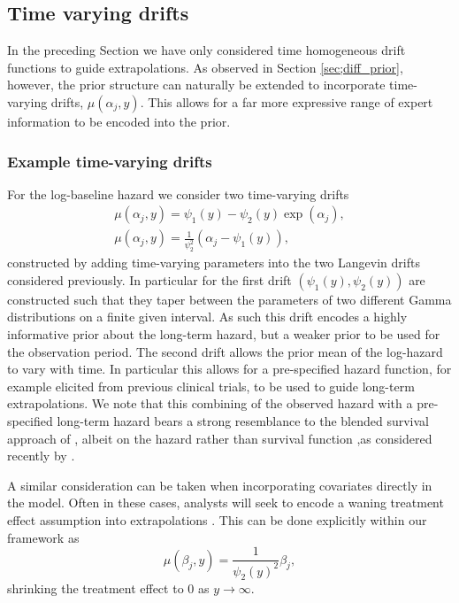 \documentclass[ba,preprint]{imsart}
\theoremstyle{plain}
\theoremstyle{definition}
\theoremstyle{remark}
\begin{document}
\subsection{Time varying drifts}
\label{sec;TimeVarying}
In the preceding Section we have only considered time homogeneous drift functions to guide extrapolations. As observed in Section \ref{sec;diff_prior}, however, the prior structure can naturally be extended to incorporate time-varying drifts, $\mu(\alpha_j,y)$. This allows for a far more expressive range of expert information to be encoded into the prior.

\subsubsection{Example time-varying drifts}

For the log-baseline hazard we consider two time-varying drifts
\begin{gather}
    \label{eq;Converge}
    \mu(\alpha_j, y) = \psi_1(y) - \psi_2(y)\exp(\alpha_j), \\ 
    \label{eq;Centred}
    \mu(\alpha_j, y) = \frac{1}{\psi_2^2}(\alpha_j - \psi_1(y)),
\end{gather}
constructed by adding time-varying parameters into the two Langevin drifts considered previously. In particular for the first drift $(\psi_1(y), \psi_2(y))$ are constructed such that they taper between the parameters of two different Gamma distributions on a finite given interval. As such this drift encodes a highly informative prior about the long-term hazard, but a weaker prior to be used for the observation period. The second drift allows the prior mean of the log-hazard to vary with time. In particular this allows for a pre-specified hazard function, for example elicited from previous clinical trials, to be used to guide long-term extrapolations. We note that this combining of the observed hazard with a pre-specified long-term hazard bears a strong resemblance to the blended survival approach of \citet{Che2023}, albeit on the hazard rather than survival function {\color{red},as considered recently by \citet{Zhu2026}.}

A similar consideration can be taken when incorporating covariates directly in the model. Often in these cases, analysts will seek to encode a waning treatment effect assumption into extrapolations \citep{Jackson2017}. This can be done explicitly within our framework as
\begin{equation}
    \label{eq;trtwane}
    \mu(\beta_j, y) = \frac{1}{\psi_2(y)^2}\beta_j,
\end{equation}
shrinking the treatment effect to 0 as $y\to\infty$.
\end{document}
